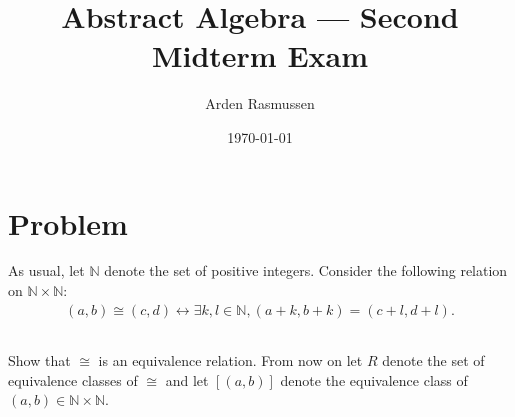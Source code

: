 \documentclass[10pt]{armath}
\title{Abstract Algebra --- Second Midterm Exam}
\author{Arden Rasmussen}
\date{\today}
\newcommand{\N}{\mathbb{N}}
\newcommand{\lra}{\longleftrightarrow}
\newcommand{\E}{\exists}
\begin{document}
\maketitle

\section{Problem}%
\label{sec:problem_1}

As usual, let $\N$ denote the set of positive integers. Consider the following
relation on $\N\times\N$:
\begin{align*}
  (a,b)\cong(c,d)\lra\E k,l\in\N,(a+k,b+k)=(c+l,d+l).
\end{align*}

\subsection{}%
\label{sub:1a}

Show that $\cong$ is an equivalence relation. From now on let $R$ denote the
set of equivalence classes of $\cong$ and let $[(a,b)]$ denote the equivalence
class of $(a,b)\in\N\times\N$.
\end{document}
